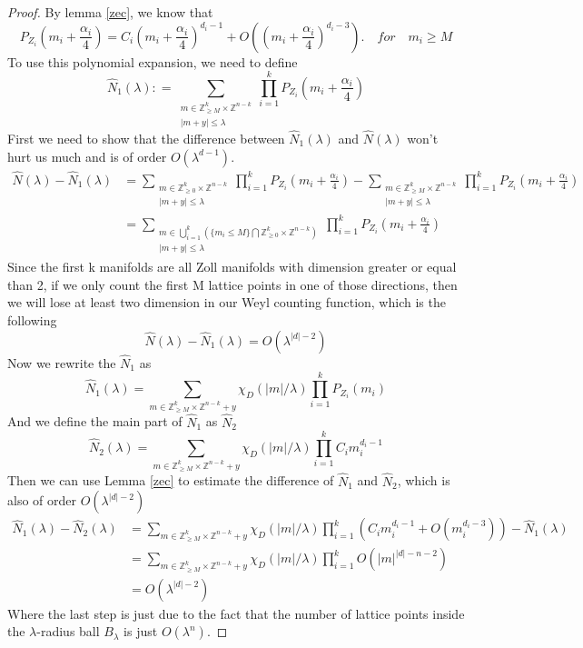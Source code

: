 \documentclass[10pt,a4paper]{amsart}
\newcommand{\Z}{{\mathbb Z}}
\begin{document}
\begin{proof}
    By lemma \ref{zec}, we know that 
    \begin{equation}
        P_{Z_i}(m_i+\frac{\alpha_i}{4}) = C_i (m_i+\frac{\alpha_i}{4})^{d_i-1} + O ((m_i+\frac{\alpha_i}{4})^{d_i-3}). \quad for \quad m_i \ge M
    \end{equation}
    To use this polynomial expansion, we need to define 
    \begin{equation}
        \hat{N}_1(\lambda) : = \sum_{\substack{m \in \Z_{\geq M}^k \times \Z^{n-k} \\ |m+y| \le \lambda }} \prod_{i = 1}^k P_{Z_i} (m_i +\frac{\alpha_i}{4})
    \end{equation}
    First we need to show that the difference between $\hat{N}_1(\lambda)$ and $\hat{N}(\lambda)$ won't hurt us much and is of order $O(\lambda^{d-1})$.
    \begin{align*}
        \hat{N}(\lambda)-\hat{N}_1(\lambda) &= \sum_{\substack{m \in \Z_{\geq 0}^k \times \Z^{n-k} \\ |m+y| \le \lambda }} \prod_{i = 1}^k P_{Z_i} (m_i +\frac{\alpha_i}{4}) - \sum_{\substack{m \in \Z_{\geq M}^k \times \Z^{n-k} \\ |m+y| \le \lambda }} \prod_{i = 1}^k P_{Z_i} (m_i +\frac{\alpha_i}{4}) \\
        & = \sum_{\substack{m \in \bigcup_{i=1}^k(\{m_i \le M\}\bigcap\Z_{\geq 0}^k \times \Z^{n-k}) \\ |m+y| \le \lambda }} \prod_{i = 1}^k P_{Z_i} (m_i +\frac{\alpha_i}{4})
    \end{align*}
    Since the first k manifolds are all Zoll manifolds with dimension greater or equal than 2, if we only count the first M lattice points in one of those directions, then we will lose at least two dimension in our Weyl counting function, which is the following
    \[
    \hat{N}(\lambda)-\hat{N}_1(\lambda) = O(\lambda^{|d|-2})
    \]
    Now we rewrite the $\hat{N}_1$ as
    \[
    \hat{N}_1(\lambda) = \sum_{m \in \Z_{\geq M}^k \times \Z^{n-k} + y} \chi_D(|m|/\lambda) \prod_{i=1}^k P_{Z_i}(m_i)
    \]
    And we define the main part of $\hat{N}_1$ as $\hat{N}_2$
    \[
    \hat{N}_2(\lambda) = \sum_{m \in \Z_{\geq M}^k \times \Z^{n-k} + y} \chi_D(|m|/\lambda) \prod_{i=1}^k C_im_i^{d_i-1}
    \]
    Then we can use Lemma \ref{zec} to estimate the difference of $\hat{N}_1$ and $\hat{N}_2$, which is also of order $O(\lambda^{|d|-2})$
    \begin{align*}
    \hat{N}_1(\lambda)-\hat{N}_2(\lambda) &= \sum_{m \in \Z_{\geq M}^k \times \Z^{n-k} + y} \chi_D(|m|/\lambda) \prod_{i=1}^k \left( C_i m_i^{d_i-1} + O(m_i^{d_i-3})\right)- \hat{N}_1(\lambda)\\
    &= \sum_{m \in \Z_{\geq M}^k \times \Z^{n-k} + y} \chi_D(|m|/\lambda) \prod_{i=1}^k O(|m|^{|d|-n-2})\\
    &= O(\lambda^{|d|-2})
    \end{align*}
    Where the last step is just due to the fact that the number of lattice points inside the $\lambda$-radius ball $B_{\lambda}$ is just $O(\lambda^n)$.


\end{proof}
\end{document}

